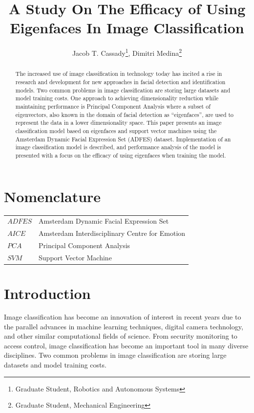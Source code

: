 \documentclass[journal]{new-aiaa}
\title{A Study On The Efficacy of Using Eigenfaces In Image Classification}
\author{Jacob T. Cassady\footnote{Graduate Student, Robotics and Autonomous Systems}, Dimitri Medina\footnote{Graduate Student, Mechanical Engineering}}
\affil{Johns Hopkins University, Whiting School of Engineering, Baltimore, MD, 21206}
\begin{document}
\maketitle
\begin{abstract}
The increased use of image classification in technology today has incited a rise in research and development for new approaches in facial detection and identification models. 
Two common problems in image classification are storing large datasets and model training costs.
One approach to achieving dimensionality reduction while maintaining performance is Principal Component Analysis where a subset of eigenvectors, also known in the domain of facial detection as ``eigenfaces'', are used to represent the data in a lower dimensionality space.
This paper presents an image classification model based on eigenfaces and support vector machines using the Amsterdam Dynamic Facial Expression Set (ADFES) dataset. 
Implementation of an image classification model is described, and performance analysis of the model is presented with a focus on the efficacy of using eigenfaces when training the model.
\end{abstract}

\section{Nomenclature}\label{sec:Nomenclature}

{\renewcommand\arraystretch{1.0}
\noindent\begin{longtable*}{@{}l @{\quad=\quad} l@{}}
$ADFES$  &    Amsterdam Dynamic Facial Expression Set \\
$AICE$   &    Amsterdam Interdisciplinary Centre for Emotion \\
$PCA$    &    Principal Component Analysis \\
$SVM$    &    Support Vector Machine \\
\end{longtable*}}

\section{Introduction}\label{sec:Introduction}
Image classification has become an innovation of interest in recent years due to the parallel advances in machine learning techniques, digital camera technology, and other similar computational fields of science. 
From security monitoring to access control, image classification has become an important tool in many diverse disciplines. 
Two common problems in image classification are storing large datasets and model training costs.
\end{document}

